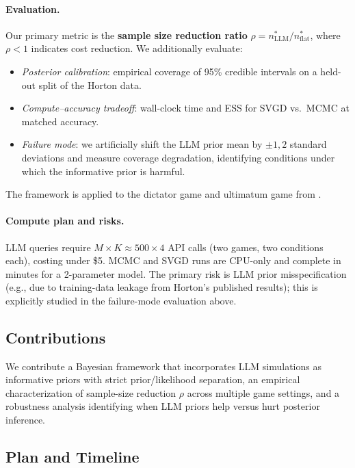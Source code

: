 \documentclass[11pt]{article}
\begin{document}
\paragraph{Evaluation.}
Our primary metric is the \textbf{sample size reduction ratio}
$\rho = n^*_{\mathrm{LLM}} / n^*_{\mathrm{flat}}$,
where $\rho < 1$ indicates cost reduction.
We additionally evaluate:
\begin{itemize}
  \item \textit{Posterior calibration}: empirical coverage of 95\%
        credible intervals on a held-out split of the Horton data.
  \item \textit{Compute--accuracy tradeoff}: wall-clock time and ESS
        for SVGD vs.\ MCMC at matched accuracy.
  \item \textit{Failure mode}: we artificially shift the LLM prior mean
        by $\pm 1, 2$ standard deviations and measure coverage degradation,
        identifying conditions under which the informative prior is harmful.
\end{itemize}
The framework is applied to the dictator game and ultimatum game from
\citet{horton2023homosilicus}.

\paragraph{Compute plan and risks.}
LLM queries require $M \times K \approx 500 \times 4$ API calls (two games,
two conditions each), costing under \$5.
MCMC and SVGD runs are CPU-only and complete in minutes for a 2-parameter
model.
The primary risk is LLM prior misspecification (e.g., due to training-data
leakage from Horton's published results); this is explicitly studied in the
failure-mode evaluation above.

\subsection{Contributions}

We contribute a Bayesian framework that incorporates LLM simulations as
informative priors with strict prior/likelihood separation, an empirical
characterization of sample-size reduction $\rho$ across multiple game
settings, and a robustness analysis identifying when LLM priors help
versus hurt posterior inference.

\subsection{Plan and Timeline}
\end{document}
